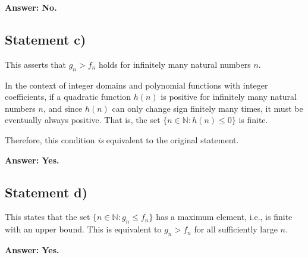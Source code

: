 \documentclass[12pt]{article}
\begin{document}
\textbf{Answer: No.}

\subsection{Statement c)}

This asserts that \( g_n > f_n \) holds for infinitely many natural numbers \( n \).

In the context of integer domains and polynomial functions with integer coefficients, if a quadratic function \( h(n) \) is positive for infinitely many natural numbers \( n \), and since \( h(n) \) can only change sign finitely many times, it must be eventually always positive. That is, the set \( \{ n \in \mathbb{N} : h(n) \leq 0 \} \) is finite.

Therefore, this condition \emph{is} equivalent to the original statement.

\textbf{Answer: Yes.}

\subsection{Statement d)}

This states that the set \( \{ n \in \mathbb{N} : g_n \leq f_n \} \) has a maximum element, i.e., is finite with an upper bound. This is equivalent to \( g_n > f_n \) for all sufficiently large \( n \).

\textbf{Answer: Yes.}
\end{document}
